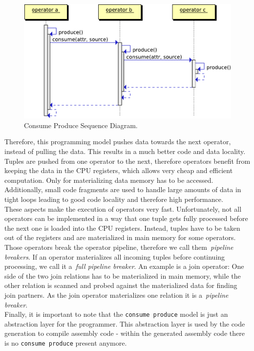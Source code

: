 \begin{figure}[htsb]
  \centerline{
      \includegraphics[scale=0.7]{figures/consume_produce}
  }
  \caption[Consume Produce Sequence Diagram]{Consume Produce Sequence Diagram.}\label{fig:consume_produce_sd}
\end{figure}


Therefore, this programming model pushes data towards the next operator, instead of pulling the data. This results in a much better code and data locality. Tuples are pushed from one operator to the next, therefore operators benefit from keeping the data in the CPU registers, which allows very cheap and efficient computation. Only for materializing data memory has to be accessed. Additionally, small code fragments are used to handle large amounts of data in tight loops leading to good code locality and therefore high performance.
\\
These aspects make the execution of operators very fast. Unfortunately, not all operators can be implemented in a way that one tuple gets fully processed before the next one is loaded into the CPU registers. Instead, tuples have to be taken out of the registers and are materialized in main memory for some operators. Those operators break the operator pipeline, therefore we call them~\emph{pipeline breakers}. If an operator materializes all incoming tuples before continuing processing, we call it a~\emph{full pipeline breaker}. An example is a join operator: One side of the two join relations has to be materialized in main memory,  while the other relation is scanned and probed against the materialized data for finding join partners. As the join operator materializes one relation it is a~\emph{pipeline breaker}.
\\
Finally, it is important to note that the \texttt{consume produce} model is just an abstraction layer for the programmer. This abstraction layer is used by the code generation to compile assembly code - within the generated assembly code there is no \texttt{consume produce} present anymore.

